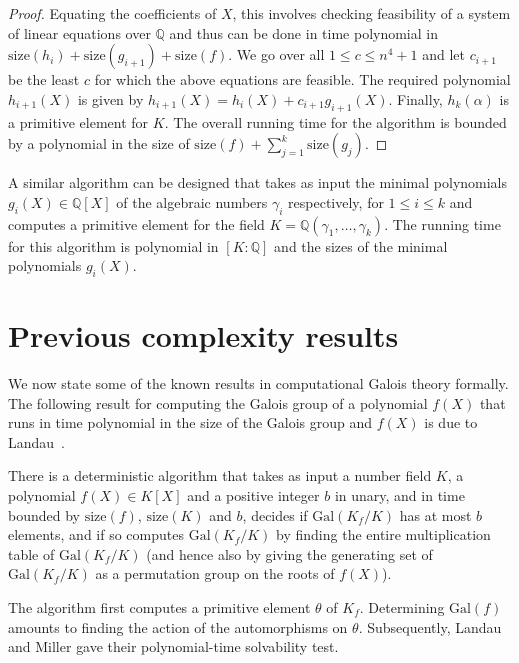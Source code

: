 \documentclass[prodmod,acmtalg]{acmsmall}
\newcommand{\size}[1]{{\ensuremath{\mathrm{size}\left(#1\right)}}}
\newcommand{\Gal}[1]{{\ensuremath{\mathrm{Gal}\left(#1\right)}}}
\newcommand{\Q}{\ensuremath{\mathbb{Q}}}
\begin{document}
\begin{proof}
  Equating the coefficients of $X$, this involves checking feasibility
  of a system of linear equations over $\Q$ and thus can be done in
  time polynomial in $\size{h_i}+\size{g_{i+1}}+\size{f}$.  We go over
  all $1 \leq c \leq n^4 +1$ and let $c_{i+1}$ be the least $c$ for
  which the above equations are feasible. The required polynomial
  $h_{i+1}(X)$ is given by $h_{i+1}(X) = h_i(X) + c_{i+1}
  g_{i+1}(X)$. Finally, $h_k(\alpha)$ is a primitive element for
  $K$. The overall running time for the algorithm is bounded by a
  polynomial in the size of $\size{f}+\sum_{j=1}^k \size{g_j}$.
\end{proof}

\begin{remark}\label{rem-prim-elt}
  A similar algorithm can be designed that takes as input the minimal
  polynomials $g_i(X) \in \Q[X]$ of the algebraic numbers $\gamma_i$
  respectively, for $1 \leq i \leq k$ and computes a primitive element
  for the field $K=\Q(\gamma_1,\ldots,\gamma_k)$. The running time for
  this algorithm is polynomial in $[K:\Q]$ and the sizes of the
  minimal polynomials $g_i(X)$.
\end{remark}

\section{Previous complexity results}

We now state some of the known results in computational Galois theory
formally. The following result for computing the Galois group of a
polynomial $f(X)$ that runs in time polynomial in the size of the
Galois group and $f(X)$ is due to Landau~\cite{landau84galois}.

\begin{theorem}[Landau] \label{thm-landau-galois-algo} There is a
  deterministic algorithm that takes as input a number field $K$, a
  polynomial $f(X) \in K[X]$ and a positive integer $b$ in unary, and
  in time bounded by $\size{f}$, $\size{K}$ and $b$, decides if
  $\Gal{K_f/K}$ has at most $b$ elements, and if so computes
  $\Gal{K_f/K}$ by finding the entire multiplication table of
  $\Gal{K_f/K}$ (and hence also by giving the generating set of
  $\Gal{K_f/K}$ as a permutation group on the roots of $f(X)$).
\end{theorem}

The algorithm first computes a primitive element $\theta$ of $K_f$.
Determining $\Gal{f}$ amounts to finding the action of the
automorphisms on $\theta$. Subsequently, Landau and Miller
\cite{landau85solvability} gave their polynomial-time solvability
test.
\end{document}
